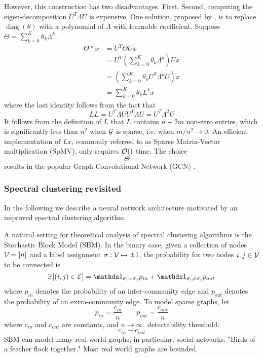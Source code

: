 \documentclass{article}
\DeclareMathOperator{\diag}{diag}
\newcommand{\ind}{{\mathds 1}}
\begin{document}
However, this construction has two disadvantages.
First,
Second, computing the eigen-decomposition $U^T \Lambda U$ is expensive.
One solution, proposed by \cite{defferrard2016convolutional}, is to replace $\diag (\theta)$ with a polynomial of $\Lambda$ with learnable coefficient.
Suppose $\Theta = \sum_{k = 0}^K \theta_k \Lambda^k$.
\begin{align*}
\Theta * x
& = U^T \Theta U x \\
& = U^T \left(\sum_{k = 0}^K \theta_k \Lambda^k \right) U x \\
& = \left(\sum_{k = 0}^K \theta_k U^T \Lambda^k U \right) x \\
& = \sum_{k = 0}^K \theta_k L^k x
\end{align*}
where the last identity follows from the fact that
\[
L L
= U^T \Lambda U U^T \Lambda U
= U^T \Lambda^2 U
\]
It follows from the definition of $L$ that $L$ contains $n + 2 m$ non-zero entries, which is significantly less than $n^2$ when ${\mathcal G}$ is sparse, i.e. when $m / n^2 \rightarrow 0$.
An efficient implementation of $L x$, commonly referred to as Sparse Matrix-Vector multiplication (SpMV), only requires ${\mathcal O} ()$ time.
The choice
\[
\Theta = 
\]
results in the popular Graph Convolutional Network (GCN) \cite{kipf2016semi}.

\subsubsection{Spectral clustering revisited}

In the following we describe a neural network architecture motivated by an improved spectral clustering algorithm.

A natural setting for theoretical analysis of spectral clustering algorithms is the Stochastic Block Model (SBM).
In the binary case, given a collection of nodes ${\mathcal V} = [n]$ and a label assignment $\sigma: {\mathcal V} \mapsto {\pm 1}$, the probability for two nodes $i, j \in {\mathcal V}$ to be connected is
\[
\bbp [(i, j) \in \cale]
= \ind_{\sigma_i = \sigma_j} p_{in} + \ind_{\sigma_i \ne \sigma_j} p_{out}
\]
where $p_{in}$ denotes the probability of an inter-community edge and $p_{out}$ denotes the probability of an extra-community edge.
To model sparse graphs, let
\[
p_{in} = \frac{c_{in}}n \qquad
p_{out} = \frac{c_{out}}n
\]
where $c_{in}$ and $c_{out}$ are constants, and $n \rightarrow \infty$.
detectability threshold:
\[
c_{in} - c_{out}
\]
SBM can model many real world graphs, in particular, social networks.
"Birds of a feather flock together."
Most real world graphs are bounded.
\end{document}

